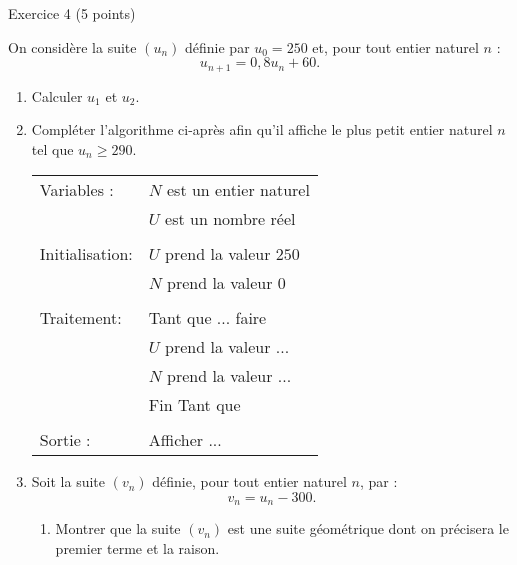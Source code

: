 
%
\begin{h2}Exercice 4 (5 points)\end{h2}
\par
On considère la suite $(u_n)$ définie par $u_0=250$ et, pour tout entier naturel $n$ :
\[u_{n+1}=0,8u_n+60.\]
\begin{enumerate}
     \item Calculer $u_1$ et $u_2$.
     \item
     Compléter l'algorithme ci-après afin qu'il affiche le plus petit entier naturel $n$ tel que $u_n \geqslant 290$.
     \begin{center}
          \begin{extern}%
               \begin{tabular}{|l l|}\hline
                    Variables :	& $N$ est un entier naturel\\
                    & $U$ est un nombre réel\\
                    & \\
                    Initialisation: &$U$ prend la valeur $250$ \\
                    &$N$ prend la valeur $0$ \\
                    & \\
                    Traitement: &Tant que ... faire\\
                    &\qquad$U$ prend la valeur ...\\
                    &\qquad$N$ prend la valeur ...\\
                    &Fin Tant que\\
                    & \\
                    Sortie :	&Afficher ... \\
                    \hline
               \end{tabular}
          \end{extern}
     \end{center}
     \item %
     Soit la suite $(v_n)$ définie, pour tout entier naturel $n$, par :
     \[ v_n=u_n-300.\]
     \begin{enumerate}[label=\alph*.]
          \item %
          Montrer que la suite $(v_n)$ est une suite géométrique dont on précisera le premier terme et la raison.

\end{enumerate}
\end{enumerate}
